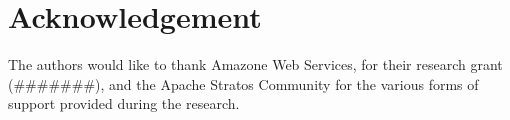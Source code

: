 \section{Acknowledgement}

The authors would like to thank Amazone Web Services, for their research grant (#######), and the Apache Stratos Community for the various forms of support provided during the research.




